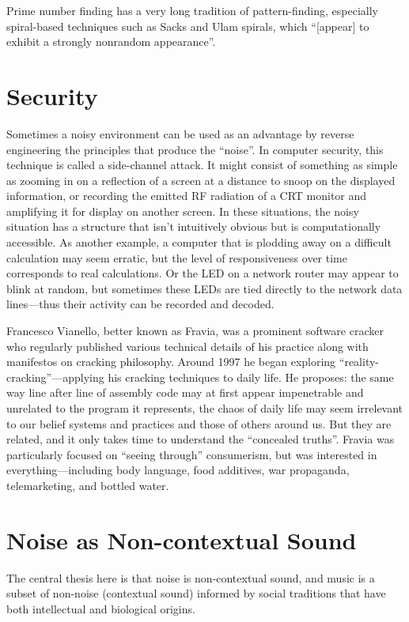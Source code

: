 \documentclass{thesis}
\begin{document}
	Prime number finding has a very long tradition of pattern-finding, especially spiral-based techniques such as Sacks\cite{michael_m._ross_natural_2007} and Ulam\cite{weisstein_prime_????} spirals, which ``[appear] to exhibit a strongly nonrandom appearance''.

\section{Security}
	Sometimes a noisy environment can be used as an advantage by reverse engineering the principles that produce the ``noise''. In computer security, this technique is called a side-channel attack. It might consist of something as simple as zooming in on a reflection of a screen at a distance to snoop on the displayed information,\cite{w._wayt_gibbs_hackers_2009} or recording the emitted RF radiation of a CRT monitor and amplifying it for display on another screen.\cite{erik_thiele_tempest_????} In these situations, the noisy situation has a structure that isn't intuitively obvious but is computationally accessible. As another example, a computer that is plodding away on a difficult calculation may seem erratic, but the level of responsiveness over time corresponds to real calculations. Or the LED on a network router may appear to blink at random, but sometimes these LEDs are tied directly to the network data lines---thus their activity can be recorded and decoded.
	
	Francesco Vianello, better known as Fravia, was a prominent software cracker who regularly published various technical details of his practice along with manifestos on cracking philosophy. Around 1997 he began exploring ``reality-cracking''\cite{francesco_vianello_reality_????}---applying his cracking techniques to daily life. He proposes: the same way line after line of assembly code may at first appear impenetrable and unrelated to the program it represents, the chaos of daily life may seem irrelevant to our belief systems and practices and those of others around us. But they are related, and it only takes time to understand the ``concealed truths''. Fravia was particularly focused on ``seeing through'' consumerism, but was interested in everything---including body language, food additives, war propaganda, telemarketing, and bottled water.
	
\section{Noise as Non-contextual Sound}
	The central thesis here is that noise is non-contextual sound, and music is a subset of non-noise (contextual sound) informed by social traditions that have both intellectual and biological origins.
\end{document}
